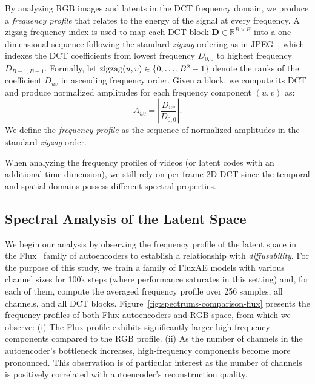 By analyzing RGB images and latents in the DCT frequency domain, we produce a \emph{frequency profile} that relates to the energy of the signal at every frequency. %
A zigzag frequency index is used to map each DCT block $\mathbf{D}\in\mathbb{R}^{B\times B}$ into a one-dimensional sequence following the standard \emph{zigzag} ordering as in JPEG~\cite{JPEG}, which indexes the DCT coefficients from lowest frequency $D_{0,0}$ to highest frequency $D_{B-1,B-1}$.
Formally, let $\operatorname{zigzag}(u,v) \in \{0,\dots,B^2-1\}$ denote the ranks of the coefficient $D_{uv}$ in ascending frequency order.
Given a block, we compute its DCT and produce normalized amplitudes for each frequency component \((u, v)\) as:
\begin{equation}  
    A_{uv} = \left |\frac{D_{uv}}{D_{0,0}} \right|.  
\end{equation}  
We define the \emph{frequency profile} as the sequence of normalized amplitudes in the standard \emph{zigzag} order.

When analyzing the frequency profiles of videos (or latent codes with an additional time dimension), we still rely on per-frame 2D DCT since the temporal and spatial domains possess different spectral properties.

\subsection{Spectral Analysis of the Latent Space}
\label{sec:method:spec}



We begin our analysis by observing the frequency profile of the latent space in the Flux~\cite{Flux} family of autoencoders to establish a relationship with \emph{diffusability}. 
For the purpose of this study, we train a family of FluxAE models with various channel sizes for 100k steps (where performance saturates in this setting) and, for each of them, compute the averaged frequency profile over 256 samples, all channels, and all DCT blocks. 
Figure~\ref{fig:spectrums-comparison-flux} presents the frequency profiles of both Flux autoencoders and RGB space, from which we observe: (i) The Flux profile exhibits significantly larger high-frequency components compared to the RGB profile. (ii) As the number of channels in the autoencoder's bottleneck increases, high-frequency components become more pronounced. This observation is of particular interest as the number of channels is positively correlated with autoencoder's reconstruction quality. %

